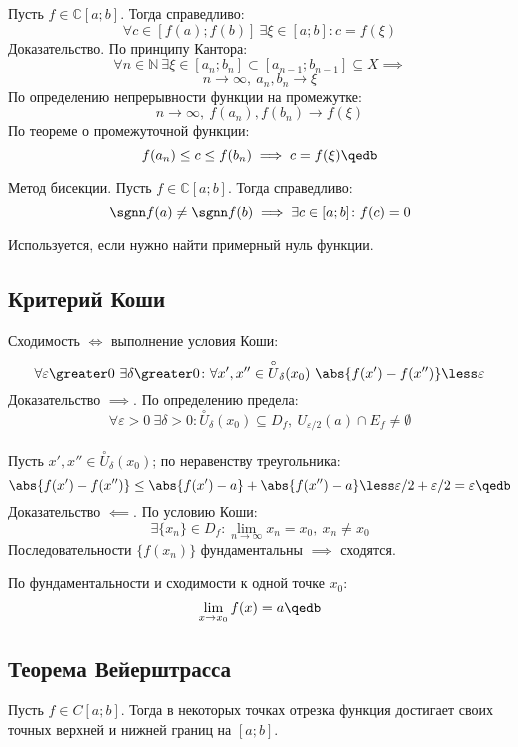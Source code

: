 Пусть $f\in\mathbb{C}[a;b]$. Тогда справедливо:
$$\forall c\in[f(a);f(b)]\ \exists\xi\in[a;b]\colon c=f(\xi)$$
{\bold Доказательство.} По принципу Кантора:
$$\forall n\in\mathbb{N}\ \exists\xi\in[a_n;b_n]\subset[a_{n-1};b_{n-1}]\subseteq X
\implies$$
$$n\to\infty,\ a_n,b_n\to\xi$$
По определению непрерывности функции на промежутке:
$$n\to\infty,\ f(a_n),f(b_n)\to f(\xi)$$
По теореме о промежуточной функции:
$$f(a_n)\leq c\leq f(b_n)\implies c=f(\xi)\qedb$$
\begin{theorem}
{\bold Метод бисекции.} Пусть $f\in\mathbb{C}[a;b]$. Тогда справедливо:
$$\sgnn f(a)\neq\sgnn f(b)\implies\exists c\in[a;b]\colon f(c)=0$$
\end{theorem}

Используется, если нужно найти {\ital примерный} нуль функции.

\subsection{Критерий Коши}

Сходимость $\iff$ выполнение {\ital условия Коши}:\\[-8pt]
$$\forall\varepsilon\greater 0\ \exists\delta\greater 0\colon\forall x',x''\in\overset
{\circ}{U}_\delta(x_0)\ \abs{f(x')-f(x'')}\less\varepsilon$$
{\bold Доказательство $\implies$.} По определению предела:\\[-8pt]
$$\forall\varepsilon\greater 0\ \exists\delta\greater 0\colon\overset{\circ}{U}_\delta
(x_0)\subseteq D_f,\ U_{\varepsilon/2}(a)\cap E_f\neq\emptyset$$\\[-6pt]
Пусть $x',x''\in\overset{\circ}{U}_\delta(x_0)$; по неравенству треугольника:
$$\abs{f(x')-f(x'')}\leq\abs{f(x')-a}+\abs{f(x'')-a}\less\varepsilon/2+\varepsilon/2=
\varepsilon\qedb$$
{\bold Доказательство $\impliedby$.} По условию Коши:
$$\exists\{x_n\}\in D_f\colon\lim_{n\to\infty}x_n=x_0,\ x_n\neq x_0$$
Последовательности $\{f(x_n)\}$ фундаментальны $\implies$ сходятся.

По фундаментальности и сходимости к одной точке $x_0$:
$$\lim_{x\to x_0}f(x)=a\qedb$$

\subsection{Теорема Вейерштрасса}

Пусть $f\in C[a;b]$. Тогда в некоторых точках отрезка функция достигает своих точных 
верхней и нижней границ на $[a;b]$.


